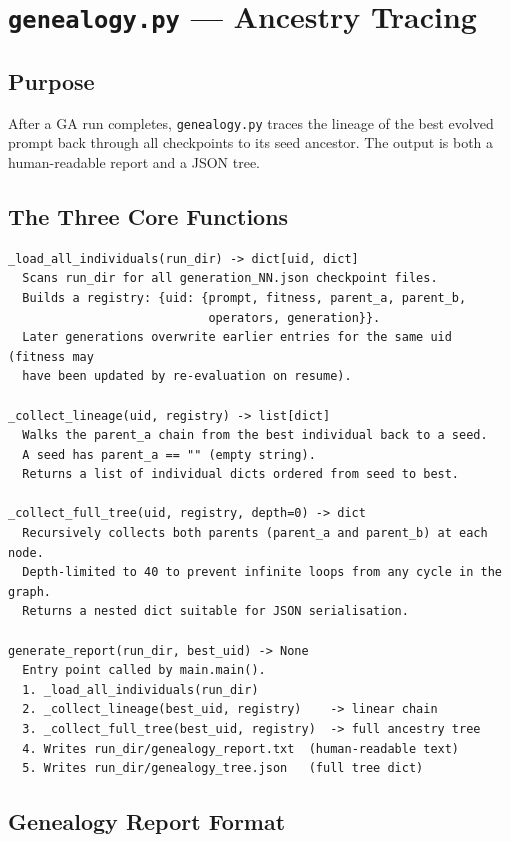 \documentclass[11pt,a4paper]{report}
\newcommand{\pyf}[1]{\texttt{#1}}
\begin{document}
\chapter{\pyf{genealogy.py} --- Ancestry Tracing}

\section{Purpose}

After a GA run completes, \pyf{genealogy.py} traces the lineage of the best evolved
prompt back through all checkpoints to its seed ancestor.  The output is both a
human-readable report and a JSON tree.

\section{The Three Core Functions}

\begin{lstlisting}[style=chain]
_load_all_individuals(run_dir) -> dict[uid, dict]
  Scans run_dir for all generation_NN.json checkpoint files.
  Builds a registry: {uid: {prompt, fitness, parent_a, parent_b,
                            operators, generation}}.
  Later generations overwrite earlier entries for the same uid (fitness may
  have been updated by re-evaluation on resume).

_collect_lineage(uid, registry) -> list[dict]
  Walks the parent_a chain from the best individual back to a seed.
  A seed has parent_a == "" (empty string).
  Returns a list of individual dicts ordered from seed to best.

_collect_full_tree(uid, registry, depth=0) -> dict
  Recursively collects both parents (parent_a and parent_b) at each node.
  Depth-limited to 40 to prevent infinite loops from any cycle in the graph.
  Returns a nested dict suitable for JSON serialisation.

generate_report(run_dir, best_uid) -> None
  Entry point called by main.main().
  1. _load_all_individuals(run_dir)
  2. _collect_lineage(best_uid, registry)    -> linear chain
  3. _collect_full_tree(best_uid, registry)  -> full ancestry tree
  4. Writes run_dir/genealogy_report.txt  (human-readable text)
  5. Writes run_dir/genealogy_tree.json   (full tree dict)
\end{lstlisting}

\section{Genealogy Report Format}
\end{document}
